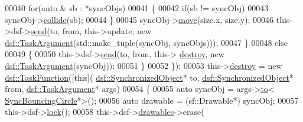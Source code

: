 \begin{DoxyCode}
00040                                                  \textcolor{keywordflow}{for}(\textcolor{keyword}{auto} & sb : *syncObjs)
00041                                                  \{
00042                                                      \textcolor{keywordflow}{if}(sb != syncObj)
00043                                                          syncObj->\hyperlink{class_sync_bouncing_circle_a30bf8948d5c62d34d9f403228571886b}{collide}(sb);
00044                                                  \}
00045                                                  syncObj->\hyperlink{class_sync_bouncing_circle_a6c3d0788f0efb17e457f1a7d9500643b}{move}(size.x, size.y);
00046                                                  this->dsf->\hyperlink{classdsf_1_1_dual_state_framework_a3063d7f0ce537eb44dc2bdcec816a36b}{send}(to, from, this->update, \textcolor{keyword}{new} 
      \hyperlink{classyc_1_1_any}{dsf::TaskArgument}(std::make\_tuple(syncObj, syncObjs)));
00047                                              \}
00048                                              \textcolor{keywordflow}{else}
00049                                              \{
00050                                                  this->dsf->\hyperlink{classdsf_1_1_dual_state_framework_a3063d7f0ce537eb44dc2bdcec816a36b}{send}(to, from, this->
      \hyperlink{class_bouncing_circle_manager_aee82e3ddd983f4e27c439b74494ab3d5}{destroy}, \textcolor{keyword}{new} \hyperlink{classyc_1_1_any}{dsf::TaskArgument}(syncObj));
00051                                              \}
00052                                          \});
00053     this->\hyperlink{class_bouncing_circle_manager_aee82e3ddd983f4e27c439b74494ab3d5}{destroy} = \textcolor{keyword}{new} \hyperlink{namespacedsf_aa16e735f29587f4485b56fc46746f7a9}{dsf::TaskFunction}([\textcolor{keyword}{this}](
      \hyperlink{classdsf_1_1_synchronized_object}{dsf::SynchronizedObject}* to, \hyperlink{classdsf_1_1_synchronized_object}{dsf::SynchronizedObject}* from, 
      \hyperlink{classyc_1_1_any}{dsf::TaskArgument}* args)
00054                                           \{
00055                                               \textcolor{keyword}{auto} syncObj = args->\hyperlink{classyc_1_1_any_a3db663604505ef8d7e84dd41d5bfcc75}{to}<
      \hyperlink{class_sync_bouncing_circle}{SyncBouncingCircle}*>();
00056                                               \textcolor{keyword}{auto} drawable = (sf::Drawable*) syncObj;
00057                                               this->dsf->\hyperlink{classdsf_1_1_lock_ae521388d861fe66b9c6e2f09811b0d4b}{lock}();
00058                                               this->dsf->\hyperlink{classdsf_1_1sfml_1_1_render_window_a745350dfdb1f752359f9055d714c453d}{drawables}->erase(

\end{DoxyCode}
